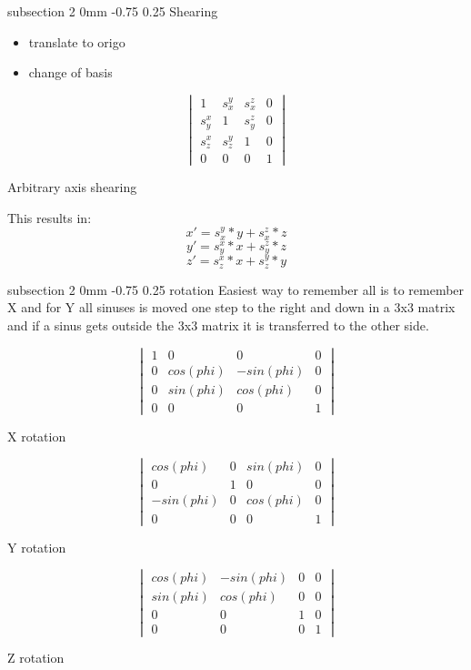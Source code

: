 \documentclass[a4paper,11pt]{article}
\makeatletter
\renewcommand{\subsection}{\@startsection
   {subsection}%
   {2}%
   {0mm}%
   {-0.75\baselineskip}%
   {0.25\baselineskip}%
   {\rmfamily\normalfont\slshape\normalsize}}%
\makeatother
\begin{document}
\subsection{Shearing}
\begin{itemize}
\item translate to origo
\item change of basis
\end{itemize}
\begin{table}[H]
$$ \begin{vmatrix} 1&s_x^y&s_x^z&0\\ s_y^x&1&s_y^z&0\\s_z^x&s_z^y&1&0\\0&0&0&1 \end{vmatrix}$$
  \caption{Arbitrary axis shearing}
\end{table}
This results in:
$$x'=s_x^y*y+s_x^z*z$$
$$y'=s_y^x*x+s_y^z*z$$
$$z'=s_z^x*x+s_z^y*y$$

\subsection{rotation}
Easiest way to remember all is to remember X and for Y all sinuses is moved one step to the right and down in a 3x3 matrix and if a sinus gets outside the 3x3 matrix it is transferred to the other side. 
\begin{table}[H]
$$ \begin{vmatrix} 1&0&0&0\\ 0&cos(phi)&-sin(phi)&0\\0&sin(phi)&cos(phi)&0\\0&0&0&1 \end{vmatrix}$$
  \caption{X rotation}
\end{table}

\begin{table}[H]
$$ \begin{vmatrix} cos(phi)&0&sin(phi)&0\\ 0&1&0&0\\-sin(phi)&0&cos(phi)&0\\0&0&0&1 \end{vmatrix}$$
  \caption{Y rotation}
\end{table}

\begin{table}[H]
$$ \begin{vmatrix} cos(phi)&-sin(phi)&0&0\\ sin(phi)&cos(phi)&0&0\\0&0&1&0\\0&0&0&1 \end{vmatrix}$$
  \caption{Z rotation}
\end{table}
\end{document}
